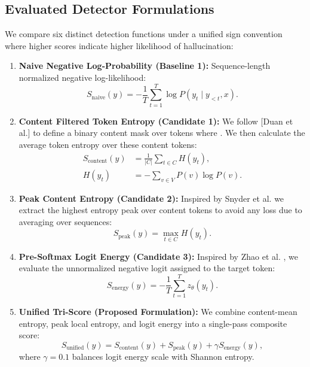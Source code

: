 \documentclass[10pt,twocolumn]{article}
\begin{document}
\subsection{Evaluated Detector Formulations}
We compare six distinct detection functions under a unified sign convention where higher scores indicate higher likelihood of hallucination:
\begin{enumerate}
    \item \textbf{Naive Negative Log-Probability (Baseline 1):} Sequence-length normalized negative log-likelihood:
    \begin{equation}
    S_{\text{naive}}(y) = -\frac{1}{T} \sum_{t=1}^T \log P(y_t \mid y_{<t}, x).
    \end{equation}
    
    \item \textbf{Content Filtered Token Entropy (Candidate 1):} We follow [Duan et al.\cite{duan2024shifting}] to define a binary content mask over tokens where . We then calculate the average token entropy over these content tokens:
    \begin{equation}
    \begin{aligned}
    S_{\text{content}}(y) &= \frac{1}{|C|} \sum_{t \in C} H(y_t),\\
    H(y_t) &= -\sum_{v \in V} P(v) \log P(v).
    \end{aligned}
    \end{equation}
    
    \item \textbf{Peak Content Entropy (Candidate 2):} Inspired by Snyder et al. \cite{snyder2024early} we extract the highest entropy peak over content tokens to avoid any loss due to averaging over sequences:
    \begin{equation}
    S_{\text{peak}}(y) = \max_{t \in C} H(y_t).
    \end{equation}
    
    \item \textbf{Pre-Softmax Logit Energy (Candidate 3):} Inspired by Zhao et al. \cite{zhao2024semantic}, we evaluate the unnormalized negative logit assigned to the target token:
    \begin{equation}
    S_{\text{energy}}(y) = -\frac{1}{T} \sum_{t=1}^T z_\theta(y_t).
    \end{equation}
    
    \item \textbf{Unified Tri-Score (Proposed Formulation):} We combine content-mean entropy, peak local entropy, and logit energy into a single-pass composite score:
    \begin{equation}
    S_{\text{unified}}(y) = S_{\text{content}}(y) + S_{\text{peak}}(y) + \gamma S_{\text{energy}}(y),
    \end{equation}
    where $\gamma = 0.1$ balances logit energy scale with Shannon entropy.
    

\end{enumerate}
\end{document}

